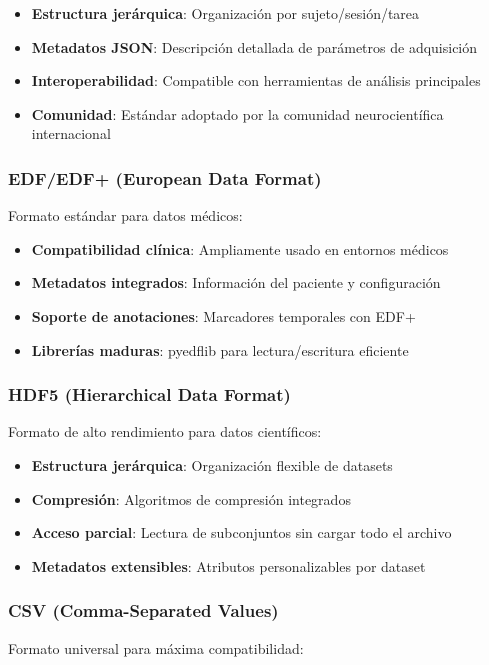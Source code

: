 \begin{itemize}
    \item \textbf{Estructura jerárquica}: Organización por sujeto/sesión/tarea
    \item \textbf{Metadatos JSON}: Descripción detallada de parámetros de adquisición
    \item \textbf{Interoperabilidad}: Compatible con herramientas de análisis principales
    \item \textbf{Comunidad}: Estándar adoptado por la comunidad neurocientífica internacional
\end{itemize}

\subsubsection{EDF/EDF+ (European Data Format)}
Formato estándar para datos médicos:

\begin{itemize}
    \item \textbf{Compatibilidad clínica}: Ampliamente usado en entornos médicos
    \item \textbf{Metadatos integrados}: Información del paciente y configuración
    \item \textbf{Soporte de anotaciones}: Marcadores temporales con EDF+
    \item \textbf{Librerías maduras}: pyedflib para lectura/escritura eficiente
\end{itemize}

\subsubsection{HDF5 (Hierarchical Data Format)}
Formato de alto rendimiento para datos científicos:

\begin{itemize}
    \item \textbf{Estructura jerárquica}: Organización flexible de datasets
    \item \textbf{Compresión}: Algoritmos de compresión integrados
    \item \textbf{Acceso parcial}: Lectura de subconjuntos sin cargar todo el archivo
    \item \textbf{Metadatos extensibles}: Atributos personalizables por dataset
\end{itemize}

\subsubsection{CSV (Comma-Separated Values)}
Formato universal para máxima compatibilidad:

